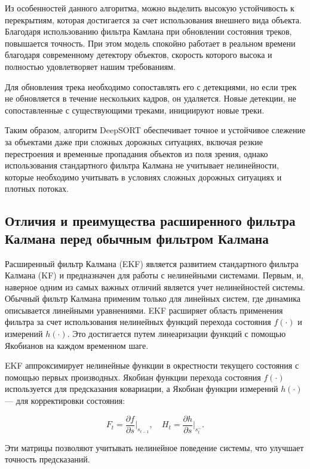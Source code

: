 Из особенностей данного алгоритма, можно выделить высокую устойчивость к перекрытиям, которая достигается за счет использования внешнего вида объекта. Благодаря использованию фильтра Камлана при обновлении состояния треков, повышается точность. При этом модель спокойно работает в реальном времени благодаря современному детектору объектов, скорость которого высока и полностью удовлетворяет нашим требованиям.

Для обновления трека необходимо сопоставлять его с детекциями, но если трек не обновляется в течение нескольких кадров, он удаляется. Новые детекции, не сопоставленные с существующими треками, инициируют новые треки.

Таким образом, алгоритм DeepSORT обеспечивает точное и устойчивое слежение за объектами даже при сложных дорожных ситуациях, включая резкие перестроения и временные пропадания объектов из поля зрения, однако использования стандартного фильтра Калмана не учитывает нелинейности, которые необходимо учитывать в условиях сложных дорожных ситуациях и плотных потоках.

\subsection{Отличия и преимущества расширенного фильтра Калмана перед обычным фильтром Калмана}

Расширенный фильтр Калмана (EKF) является развитием стандартного фильтра Калмана (KF) и предназначен для работы с нелинейными системами. Первым, и, наверное одним из самых важных отличий является учет нелинейностей системы. Обычный фильтр Калмана применим только для линейных систем, где динамика описывается линейными уравнениями. EKF расширяет область применения фильтра за счет использования нелинейных функций перехода состояния $f(\cdot)$ и измерений $h(\cdot)$. Это достигается путем линеаризации функций с помощью Якобианов на каждом временном шаге.

EKF аппроксимирует нелинейные функции в окрестности текущего состояния с помощью первых производных. Якобиан функции перехода состояния $f(\cdot)$ используется для предсказания ковариации, а Якобиан функции измерений $h(\cdot)$ — для корректировки состояния:

\begin{equation}
    {F}_t = \frac{\partial f}{\partial {s}} \big|_{{s}_{t-1}}, \quad {H}_t = \frac{\partial h}{\partial {s}} \big|_{{s}_t^-}.
\end{equation}

Эти матрицы позволяют учитывать нелинейное поведение системы, что улучшает точность предсказаний.

